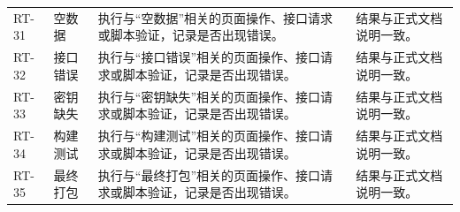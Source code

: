 \documentclass[12pt,a4paper]{ctexart}
\begin{document}
\begin{longtable}{L{1.8cm}L{3.2cm}L{6.4cm}L{4.0cm}}
RT-31 & 空数据 & 执行与“空数据”相关的页面操作、接口请求或脚本验证，记录是否出现错误。 & 结果与正式文档说明一致。 \\
RT-32 & 接口错误 & 执行与“接口错误”相关的页面操作、接口请求或脚本验证，记录是否出现错误。 & 结果与正式文档说明一致。 \\
RT-33 & 密钥缺失 & 执行与“密钥缺失”相关的页面操作、接口请求或脚本验证，记录是否出现错误。 & 结果与正式文档说明一致。 \\
RT-34 & 构建测试 & 执行与“构建测试”相关的页面操作、接口请求或脚本验证，记录是否出现错误。 & 结果与正式文档说明一致。 \\
RT-35 & 最终打包 & 执行与“最终打包”相关的页面操作、接口请求或脚本验证，记录是否出现错误。 & 结果与正式文档说明一致。 \\
\bottomrule
\end{longtable}
\end{document}
